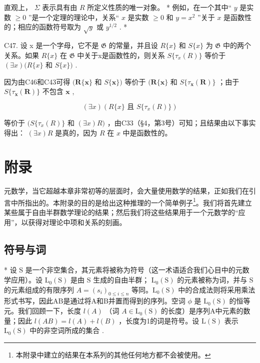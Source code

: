 直观上， \(\Sigma\) 表示具有由 \(R\) 所定义性质的唯一对象。 * 例如，在一个其中“ \(y\) 是实数 \(\geqslant 0\) ''是一个定理的理论中，关系“ \(x\) 是实数 \(\geqslant 0\) 和 \(y = x^{2}\) ”关于 \(x\) 是函数性的；相应的函数符号取为 \(\sqrt{y}\) 或 \(y^{1/2}\) . *

C47. 设 x 是一个字母，它不是 \(\mathfrak{G}\) 的常量，并且设 \(R\{x\}\) 和 \(S\{x\}\) 为 \(\mathfrak{G}\) 中的两个关系。如果 \(R\{x\}\) 在 \(\mathfrak{G}\) 中关于x是函数性的，则关系 \(S\{\tau_{x}(R)\}\) 等价于 \((\exists x)(R\{x\}\) 和 \(S\{x\})\) .

因为由C46和C43可得 \((\pmb{R}\{\pmb{x}\}\) 和 \(S\{\pmb{x}\})\) 等价于 \((\pmb{R}\{\pmb{x}\}\) 和 \(S\{\tau_{\pmb{x}}(\pmb{R})\}\) ；由于 \(S\{\tau_{\pmb{x}}(\pmb{R})\}\) 不包含 \(\pmb{x}\) ,

\[
(\exists x) (R \{x \} \text {   且   } S \{\tau_ {x} (R) \})
\]

等价于 \((S\{\tau_x(R)\}\) 和 \((\exists x)R)\) ，由C33（§4，第3号）可知；且结果由以下事实得出： \((\exists x)R\) 是真的，因为 \(R\) 在 \(x\) 中是函数性的。

\clearpage
\section*{附录}
{}
\setcounter{subsection}{0}


元数学，当它超越本章非常初等的层面时，会大量使用数学的结果，正如我们在引言中所指出的。本附录的目的是给出这种推理的一个简单例子\footnote{本附录中建立的结果在本系列的其他任何地方都不会被使用。}。我们将首先建立某些属于自由半群数学理论的结果；然后我们将这些结果用于一个元数学的“应用”，以获得对理论中项和关系的刻画。

\subsection{符号与词}

* 设 S 是一个非空集合，其元素将被称为符号（这一术语适合我们心目中的元数学应用）。设 \(\mathrm{L}_{0}(\mathrm{S})\) 是由 S 生成的自由半群； \(\mathrm{L}_{0}(\mathrm{S})\) 的元素被称为词，并与 S 的元素组成的有限序列 \(A = (s_{i})_{0 \leqslant i \leqslant n}\) 等同。\(\mathrm{L}_{0}(\mathrm{S})\) 中的合成法则将采用乘法形式书写，因此AB是通过将A和B并置而得到的序列。空词 \(\phi\) 是 \(\mathrm{L}_{0}(\mathrm{S})\) 的恒等元。我们回顾一下，长度 \(l(A)\) （词 \(A \in \mathrm{L}_{0}(\mathrm{S})\) 的长度）是序列A中元素的数量；因此 \(l(AB) = l(A) + l(B)\) ，长度为1的词是符号。设 \(\mathrm{L}(\mathrm{S})\) 表示 \(\mathrm{L}_{0}(\mathrm{S})\) 中的非空词所成的集合 .

